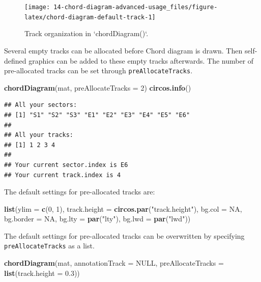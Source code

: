 \documentclass[]{book}
\newenvironment{Shaded}{\begin{snugshade}}{\end{snugshade}}
\newcommand{\KeywordTok}[1]{\textcolor[rgb]{0.13,0.29,0.53}{\textbf{#1}}}
\newcommand{\DataTypeTok}[1]{\textcolor[rgb]{0.13,0.29,0.53}{#1}}
\newcommand{\DecValTok}[1]{\textcolor[rgb]{0.00,0.00,0.81}{#1}}
\newcommand{\FloatTok}[1]{\textcolor[rgb]{0.00,0.00,0.81}{#1}}
\newcommand{\StringTok}[1]{\textcolor[rgb]{0.31,0.60,0.02}{#1}}
\newcommand{\OtherTok}[1]{\textcolor[rgb]{0.56,0.35,0.01}{#1}}
\newcommand{\NormalTok}[1]{#1}
\theoremstyle{definition}
\theoremstyle{definition}
\theoremstyle{remark}
\begin{document}
\begin{figure}

{\centering \texttt{[image: 14-chord-diagram-advanced-usage\_files/figure-latex/chord-diagram-default-track-1]} 

}

\caption{Track organization in `chordDiagram()`.}\label{fig:chord-diagram-default-track}
\end{figure}

Several empty tracks can be allocated before Chord diagram is drawn.
Then self-defined graphics can be added to these empty tracks
afterwards. The number of pre-allocated tracks can be set through
\texttt{preAllocateTracks}.

\begin{Shaded}
\begin{Highlighting}[]
\KeywordTok{chordDiagram}\NormalTok{(mat, }\DataTypeTok{preAllocateTracks =} \DecValTok{2}\NormalTok{)}
\KeywordTok{circos.info}\NormalTok{()}
\end{Highlighting}
\end{Shaded}

\begin{verbatim}
## All your sectors:
## [1] "S1" "S2" "S3" "E1" "E2" "E3" "E4" "E5" "E6"
## 
## All your tracks:
## [1] 1 2 3 4
## 
## Your current sector.index is E6
## Your current track.index is 4
\end{verbatim}

The default settings for pre-allocated tracks are:

\begin{Shaded}
\begin{Highlighting}[]
\KeywordTok{list}\NormalTok{(}\DataTypeTok{ylim =} \KeywordTok{c}\NormalTok{(}\DecValTok{0}\NormalTok{, }\DecValTok{1}\NormalTok{),}
     \DataTypeTok{track.height =} \KeywordTok{circos.par}\NormalTok{(}\StringTok{"track.height"}\NormalTok{),}
     \DataTypeTok{bg.col =} \OtherTok{NA}\NormalTok{,}
     \DataTypeTok{bg.border =} \OtherTok{NA}\NormalTok{,}
     \DataTypeTok{bg.lty =} \KeywordTok{par}\NormalTok{(}\StringTok{"lty"}\NormalTok{),}
     \DataTypeTok{bg.lwd =} \KeywordTok{par}\NormalTok{(}\StringTok{"lwd"}\NormalTok{))}
\end{Highlighting}
\end{Shaded}

The default settings for pre-allocated tracks can be overwritten by
specifying \texttt{preAllocateTracks} as a list.

\begin{Shaded}
\begin{Highlighting}[]
\KeywordTok{chordDiagram}\NormalTok{(mat, }\DataTypeTok{annotationTrack =} \OtherTok{NULL}\NormalTok{,}
    \DataTypeTok{preAllocateTracks =} \KeywordTok{list}\NormalTok{(}\DataTypeTok{track.height =} \FloatTok{0.3}\NormalTok{))}
\end{Highlighting}
\end{Shaded}
\end{document}

